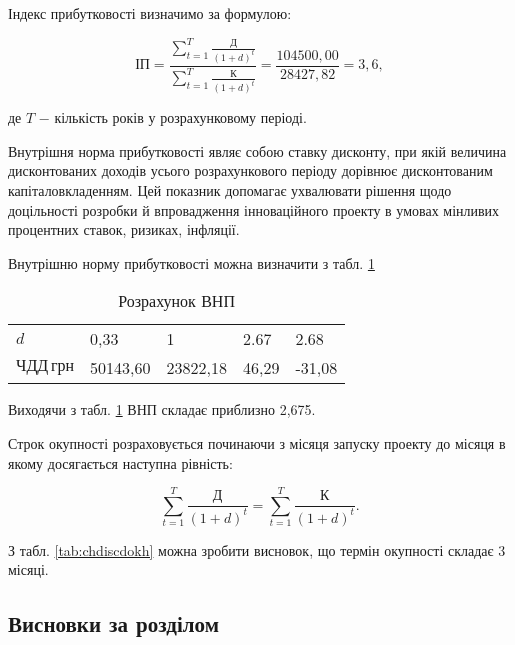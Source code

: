 Індекс прибутковості визначимо за формулою:

\begin{equation}\label{eq:economy15}
	\text{ІП} = \frac{\sum_{t=1}^{T}\frac{\text{Д}}{(1 + d)^{t}}}{\sum_{t=1}^{T}\frac{\text{К}}{(1 + d)^{t}}} = \frac{104500,00}{28427,82} = 3,6,
\end{equation}

\noindent де $T$ $-$ кількість років у розрахунковому періоді.

\vspace{1.5em}

Внутрішня норма прибутковості являє собою ставку дисконту, при якій величина дисконтованих доходів усього розрахункового періоду дорівнює дисконтованим капіталовкладенням. Цей показник допомагає ухвалювати рішення щодо доцільності розробки й впровадження інноваційного проекту в умовах мінливих процентних ставок, ризиках, інфляції.

Внутрішню норму прибутковості можна визначити з табл. \ref{tab:vnp}

\begin{table}[h!]
	\captionstyle{ \raggedright}
	\caption{Розрахунок ВНП}\label{tab:vnp}
	\begin{tabular}{| p{} | p{} | p{} | p{} | p{} |}
		\hline
		$d$ & 0,33 & 1 & 2.67 & 2.68 \\
		\hlinewd{2pt}
		$\text{ЧДД} \, \text{грн}$ & 50143,60 & 23822,18 & 46,29 & -31,08 \\
		\hline
	\end{tabular}
\end{table}

Виходячи з табл. \ref{tab:vnp} ВНП складає приблизно 2,675.

Строк окупності розраховується починаючи з місяця запуску проекту до місяця в якому досягається наступна рівність:

\begin{equation}\label{eq:economy16}
	\sum_{t=1}^{T}\frac{\text{Д}}{(1 + d)^{t}} = \sum_{t=1}^{T}\frac{\text{К}}{(1 + d)^{t}}.
\end{equation}

\vspace{1.5em}

З табл. \ref{tab:chdiscdokh} можна зробити висновок, що термін окупності складає 3 місяці.

\subsection{Висновки за розділом}

